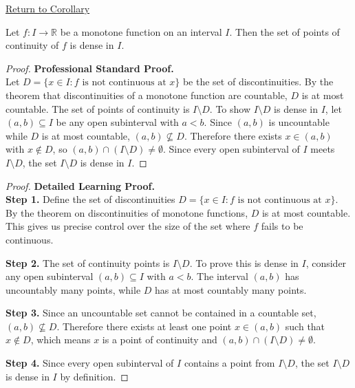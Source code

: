 \newpage
{}
\label{prf:monotone-continuous-on-dense-set}

\begin{remark*}[Return]
\hyperref[cor:monotone-continuous-on-dense-set]{Return to Corollary}
\end{remark*}

\begin{theorem*}
Let $f : I \to \mathbb{R}$ be a monotone function on an interval $I$. Then the set of points of continuity of $f$ is dense in $I$.
\end{theorem*}

\begin{proof}
\textbf{Professional Standard Proof.}~\\
Let $D = \{x \in I : f \text{ is not continuous at } x\}$ be the set of discontinuities. By the theorem that discontinuities of a monotone function are countable, $D$ is at most countable. The set of points of continuity is $I \setminus D$. To show $I \setminus D$ is dense in $I$, let $(a, b) \subseteq I$ be any open subinterval with $a < b$. Since $(a, b)$ is uncountable while $D$ is at most countable, $(a, b) \not\subseteq D$. Therefore there exists $x \in (a, b)$ with $x \notin D$, so $(a, b) \cap (I \setminus D) \neq \emptyset$. Since every open subinterval of $I$ meets $I \setminus D$, the set $I \setminus D$ is dense in $I$.
\end{proof}

\begin{proof}
\textbf{Detailed Learning Proof.}~\\

\textbf{Step 1.} Define the set of discontinuities $D = \{x \in I : f \text{ is not continuous at } x\}$. By the theorem on discontinuities of monotone functions, $D$ is at most countable. This gives us precise control over the size of the set where $f$ fails to be continuous.

\textbf{Step 2.} The set of continuity points is $I \setminus D$. To prove this is dense in $I$, consider any open subinterval $(a, b) \subseteq I$ with $a < b$. The interval $(a, b)$ has uncountably many points, while $D$ has at most countably many points.

\textbf{Step 3.} Since an uncountable set cannot be contained in a countable set, $(a, b) \not\subseteq D$. Therefore there exists at least one point $x \in (a, b)$ such that $x \notin D$, which means $x$ is a point of continuity and $(a, b) \cap (I \setminus D) \neq \emptyset$.

\textbf{Step 4.} Since every open subinterval of $I$ contains a point from $I \setminus D$, the set $I \setminus D$ is dense in $I$ by definition.
\end{proof}

